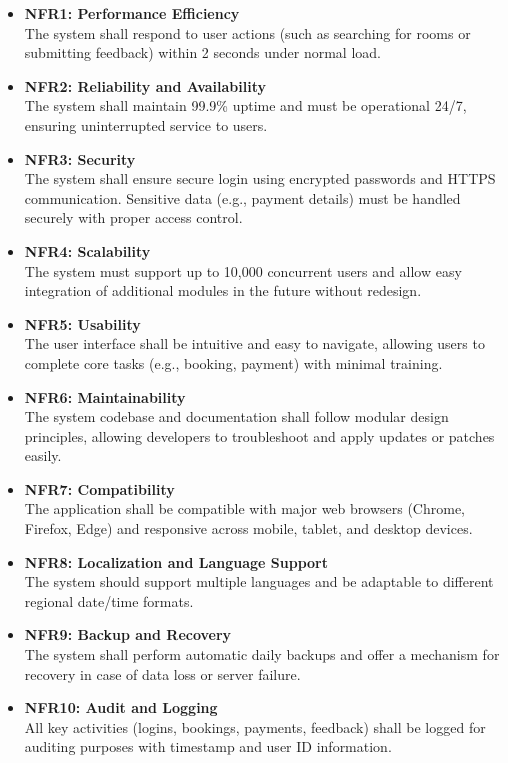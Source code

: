\documentclass[a4paper,12pt]{article}
\begin{document}
\begin{itemize}
    \item \textbf{NFR1: Performance Efficiency} \\
    The system shall respond to user actions (such as searching for rooms or submitting feedback) within 2 seconds under normal load.

    \item \textbf{NFR2: Reliability and Availability} \\
    The system shall maintain 99.9\% uptime and must be operational 24/7, ensuring uninterrupted service to users.

    \item \textbf{NFR3: Security} \\
    The system shall ensure secure login using encrypted passwords and HTTPS communication. Sensitive data (e.g., payment details) must be handled securely with proper access control.

    \item \textbf{NFR4: Scalability} \\
    The system must support up to 10,000 concurrent users and allow easy integration of additional modules in the future without redesign.

    \item \textbf{NFR5: Usability} \\
    The user interface shall be intuitive and easy to navigate, allowing users to complete core tasks (e.g., booking, payment) with minimal training.

    \item \textbf{NFR6: Maintainability} \\
    The system codebase and documentation shall follow modular design principles, allowing developers to troubleshoot and apply updates or patches easily.

    \item \textbf{NFR7: Compatibility} \\
    The application shall be compatible with major web browsers (Chrome, Firefox, Edge) and responsive across mobile, tablet, and desktop devices.

    \item \textbf{NFR8: Localization and Language Support} \\
    The system should support multiple languages and be adaptable to different regional date/time formats.

    \item \textbf{NFR9: Backup and Recovery} \\
    The system shall perform automatic daily backups and offer a mechanism for recovery in case of data loss or server failure.

    \item \textbf{NFR10: Audit and Logging} \\
    All key activities (logins, bookings, payments, feedback) shall be logged for auditing purposes with timestamp and user ID information.
\end{itemize}
\end{document}
